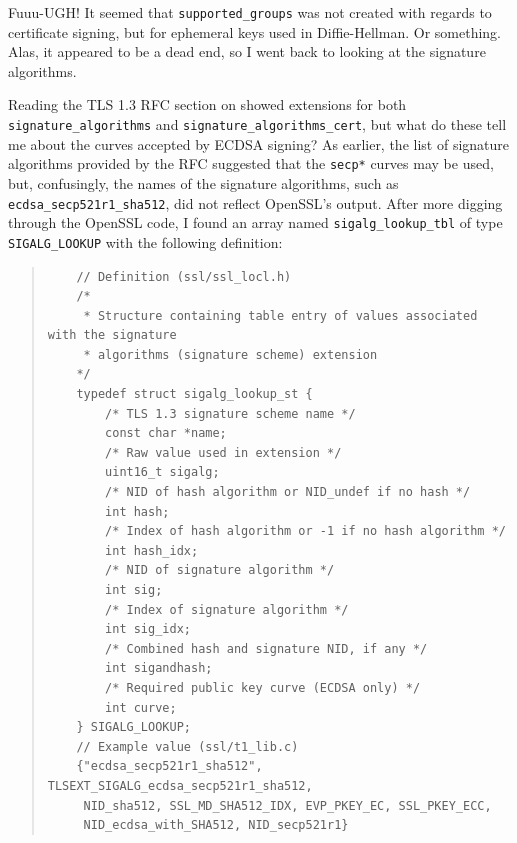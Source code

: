 \documentclass{article}
\begin{document}
Fuuu-UGH!  It seemed that \texttt{supported_groups} was not created with regards to certificate signing, but for ephemeral keys used in Diffie-Hellman.  Or something.  Alas, it appeared to be a dead end, so I went back to looking at the signature algorithms.

Reading the TLS 1.3 RFC section on  showed extensions for both \texttt{signature_algorithms} and \texttt{signature_algorithms_cert}, but what do these tell me about the curves accepted by ECDSA signing?  As earlier, the list of signature algorithms provided by the RFC suggested that the \texttt{secp*} curves may be used, but, confusingly, the names of the signature algorithms, such as \texttt{ecdsa_secp521r1_sha512}, did not reflect OpenSSL's output.  After more digging through the OpenSSL code, I found an array named \texttt{sigalg_lookup_tbl} of type \texttt{SIGALG_LOOKUP} with the following definition:

\begin{quote}
\begin{verbatim}
	// Definition (ssl/ssl_locl.h)
	/*
	 * Structure containing table entry of values associated with the signature
	 * algorithms (signature scheme) extension
	*/
	typedef struct sigalg_lookup_st {
	    /* TLS 1.3 signature scheme name */
	    const char *name;
	    /* Raw value used in extension */
	    uint16_t sigalg;
	    /* NID of hash algorithm or NID_undef if no hash */
	    int hash;
	    /* Index of hash algorithm or -1 if no hash algorithm */
	    int hash_idx;
	    /* NID of signature algorithm */
	    int sig;
	    /* Index of signature algorithm */
	    int sig_idx;
	    /* Combined hash and signature NID, if any */
	    int sigandhash;
	    /* Required public key curve (ECDSA only) */
	    int curve;
	} SIGALG_LOOKUP;
	// Example value (ssl/t1_lib.c)
	{"ecdsa_secp521r1_sha512", TLSEXT_SIGALG_ecdsa_secp521r1_sha512,
	 NID_sha512, SSL_MD_SHA512_IDX, EVP_PKEY_EC, SSL_PKEY_ECC,
	 NID_ecdsa_with_SHA512, NID_secp521r1}
\end{verbatim}
\end{quote}
\end{document}
